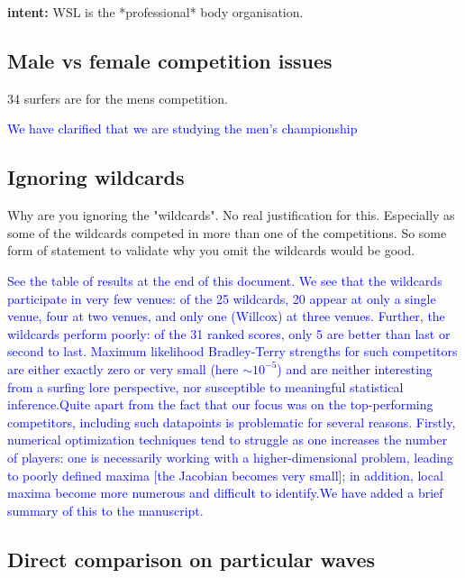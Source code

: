 \documentclass[12pt]{article}
\begin{document}
{\bf intent: }  WSL is the *professional* body organisation.  


\subsection*{Male vs female competition issues}

34 surfers are for the mens competition.


\textcolor{blue}{We have clarified that we are studying the men's
  championship}


\subsection*{Ignoring wildcards}

Why are you ignoring the "wildcards". No real justification for
this. Especially as some of the wildcards competed in more than one of
the competitions. So some form of statement to validate why you omit
the wildcards would be good.

\textcolor{blue}{See the table of results at the end of this document.
  We see that the wildcards participate in very few venues: of the 25
  wildcards, 20 appear at only a single venue, four at two venues, and
  only one (Willcox) at three venues.  Further, the wildcards perform
  poorly: of the 31 ranked scores, only 5 are better than last or
  second to last.  Maximum likelihood Bradley-Terry strengths for such
  competitors are either exactly zero or very small (here $\sim
  10^{-5}$) and are neither interesting from a surfing lore
  perspective, nor susceptible to meaningful statistical
  inference.\newline Quite apart from the fact that our focus was on
  the top-performing competitors, including such datapoints is
  problematic for several reasons.  Firstly, numerical optimization
  techniques tend to struggle as one increases the number of players:
  one is necessarily working with a higher-dimensional problem,
  leading to poorly defined maxima [the Jacobian becomes very small];
  in addition, local maxima become more numerous and difficult to
  identify.\newline We have added a brief summary of this to the
  manuscript.}

\subsection*{Direct comparison on particular waves}
\end{document}
